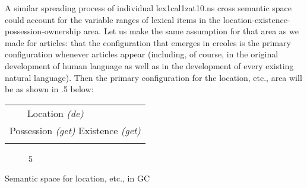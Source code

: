 A similar spreading process of individual lex1cal1zat10.ns cross semantic space could account for the variable ranges of lexical items 
in the location-existence-possession-ownership area. Let us make the same assumption for that area as we made for articles: that the con\-figuration that emerges in creoles is the primary configuration whenever articles appear (including, of course, in the original development of human language as well as in the development of every existing natural language). Then the primary configuration for the location, etc., area will be as shown in .5 below:

\begin{tabular}{ll}
\lsptoprule

\multicolumn{1}{l}{Ownership \textit{(a)}} & Location \textit{(}\textit{de)}\\
\multicolumn{2}{l}{Possession \textit{(get) }Existence \textit{(get)}}\\
\lspbottomrule
\end{tabular}
\begin{figure}
\caption{5}
\label{fig:4}
\end{figure}

Semantic space for location, etc., in GC

